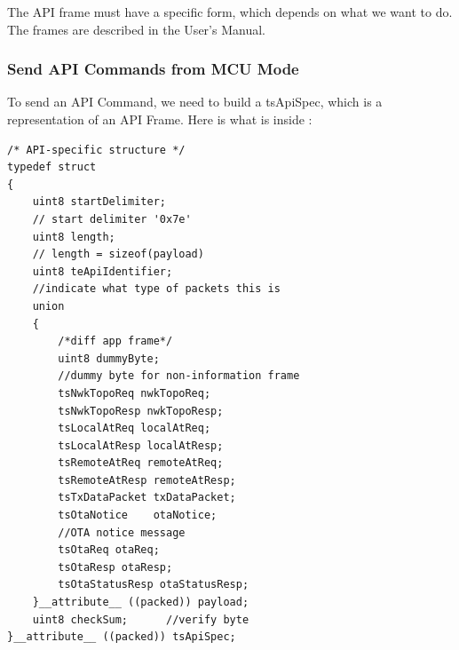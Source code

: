 The API frame must have a specific form, which depends on what we want to do. The frames are described in the User's Manual.

\subsubsection{Send API Commands from MCU Mode}

To send an API Command, we need to build a tsApiSpec, which is a representation of an API Frame. Here is what is inside :

\begin{lstlisting}[frame=single]
/* API-specific structure */                                                                             
typedef struct                                                                                           
{                                                                                                        
    uint8 startDelimiter;   
    // start delimiter '0x7e'                                                    
    uint8 length;           
    // length = sizeof(payload)                                                  
    uint8 teApiIdentifier;  
    //indicate what type of packets this is                                      
    union                                                                                                
    {                                                                                                    
        /*diff app frame*/                                                                               
        uint8 dummyByte;            
        //dummy byte for non-information frame                               
        tsNwkTopoReq nwkTopoReq;                                                                         
        tsNwkTopoResp nwkTopoResp;                                                                       
        tsLocalAtReq localAtReq;                                                                         
        tsLocalAtResp localAtResp;                                                                       
        tsRemoteAtReq remoteAtReq;                                                                       
        tsRemoteAtResp remoteAtResp;                                                                     
        tsTxDataPacket txDataPacket;                                                                     
        tsOtaNotice    otaNotice;    
        //OTA notice message                                                
        tsOtaReq otaReq;                                                                                 
        tsOtaResp otaResp;                                                                               
        tsOtaStatusResp otaStatusResp;                                                                   
    }__attribute__ ((packed)) payload;                                                                   
    uint8 checkSum;      //verify byte                                            
}__attribute__ ((packed)) tsApiSpec;
\end{lstlisting}

